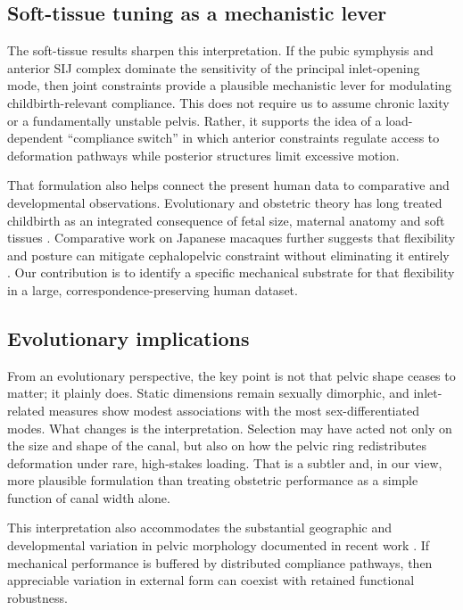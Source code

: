 \documentclass[11pt,a4paper]{article}
\begin{document}
\subsection{Soft-tissue tuning as a mechanistic lever}

The soft-tissue results sharpen this interpretation. If the pubic symphysis and anterior SIJ complex dominate the sensitivity of the principal inlet-opening mode, then joint constraints provide a plausible mechanistic lever for modulating childbirth-relevant compliance. This does not require us to assume chronic laxity or a fundamentally unstable pelvis. Rather, it supports the idea of a load-dependent ``compliance switch'' in which anterior constraints regulate access to deformation pathways while posterior structures limit excessive motion.

That formulation also helps connect the present human data to comparative and developmental observations. Evolutionary and obstetric theory has long treated childbirth as an integrated consequence of fetal size, maternal anatomy and soft tissues \citep{RosenbergTrevathan2002,Pavlicev2020}. Comparative work on Japanese macaques further suggests that flexibility and posture can mitigate cephalopelvic constraint without eliminating it entirely \citep{Pink2024}. Our contribution is to identify a specific mechanical substrate for that flexibility in a large, correspondence-preserving human dataset.

\subsection{Evolutionary implications}

From an evolutionary perspective, the key point is not that pelvic shape ceases to matter; it plainly does. Static dimensions remain sexually dimorphic, and inlet-related measures show modest associations with the most sex-differentiated modes. What changes is the interpretation. Selection may have acted not only on the size and shape of the canal, but also on how the pelvic ring redistributes deformation under rare, high-stakes loading. That is a subtler and, in our view, more plausible formulation than treating obstetric performance as a simple function of canal width alone.

This interpretation also accommodates the substantial geographic and developmental variation in pelvic morphology documented in recent work \citep{BettiManica2018,Novak2020}. If mechanical performance is buffered by distributed compliance pathways, then appreciable variation in external form can coexist with retained functional robustness.
\end{document}
